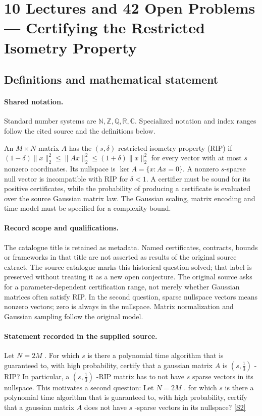 \documentclass[11pt]{article}
\newcommand{\sref}[2]{\hyperlink{source:#1:#2}{[S#2]}}
\begin{document}
\section{10 Lectures and 42 Open Problems — Certifying the Restricted Isometry Property}\label{statement}

\subsection{Definitions and mathematical statement}

\paragraph{Shared notation.}Standard number systems are $\mathbb N,\mathbb Z,\mathbb Q,\mathbb R,\mathbb C$. Specialized notation and index ranges follow the cited source and the definitions below.


An $M\times N$ matrix $A$ has the $(s,\delta)$ restricted isometry property (RIP) if $(1-\delta)\lVert x\rVert_2^2\leq\lVert Ax\rVert_2^2\leq(1+\delta)\lVert x\rVert_2^2$ for every vector with at most $s$ nonzero coordinates. Its nullspace is $\ker A=\{x:Ax=0\}$. A nonzero $s$-sparse null vector is incompatible with RIP for $\delta<1$. A certifier must be sound for its positive certificates, while the probability of producing a certificate is evaluated over the source Gaussian matrix law. The Gaussian scaling, matrix encoding and time model must be specified for a complexity bound.
\paragraph{Record scope and qualifications.}
The catalogue title is retained as metadata. Named certificates, contracts, bounds or frameworks in that title are not asserted as results of the original source extract.
The source catalogue marks this historical question solved; that label is preserved without treating it as a new open conjecture. The original source asks for a parameter-dependent certification range, not merely whether Gaussian matrices often satisfy RIP. In the second question, sparse nullspace vectors means nonzero vectors; zero is always in the nullspace. Matrix normalization and Gaussian sampling follow the original model.
\paragraph{Statement recorded in the supplied source.}
Let $N = 2M$ . For which $s$ is there a polynomial time algorithm that is guaranteed to, with high probability, certify that a gaussian matrix $A$ is $\left(s,\frac13\right)$ -RIP? In particular, a $\left(s,\frac13\right)$ -RIP matrix has to not have $s$ sparse vectors in its nullspace. This motivates a second question: Let $N = 2M$ . for which $s$ is there a polynomial time algorithm that is guaranteed to, with high probability, certify that a gaussian matrix $A$ does not have $s$ -sparse vectors in its nullspace? \sref{statement}{2}
\end{document}
